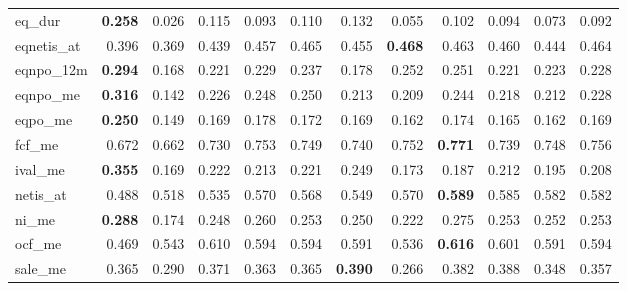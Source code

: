 \begin{landscape}
\begin{longtable}{>{\raggedright\arraybackslash}p{2.6cm}rrrrrrrrrrr}
eq\_dur & \textbf{0.258} & 0.026 & 0.115 & 0.093 & 0.110 & 0.132 & 0.055 & 0.102 & 0.094 & 0.073 & 0.092 \\
eqnetis\_at & 0.396 & 0.369 & \cellcolor{blue!10}0.439 & \cellcolor{blue!10}0.457 & \cellcolor{blue!10}0.465 & \cellcolor{blue!10}0.455 & \textbf{\cellcolor{blue!10}0.468} & \cellcolor{blue!10}0.463 & \cellcolor{blue!10}0.460 & \cellcolor{blue!10}0.444 & \cellcolor{blue!10}0.464 \\
eqnpo\_12m & \textbf{0.294} & 0.168 & 0.221 & 0.229 & 0.237 & 0.178 & 0.252 & 0.251 & 0.221 & 0.223 & 0.228 \\
eqnpo\_me & \textbf{0.316} & 0.142 & 0.226 & 0.248 & 0.250 & 0.213 & 0.209 & 0.244 & 0.218 & 0.212 & 0.228 \\
eqpo\_me & \textbf{0.250} & 0.149 & 0.169 & 0.178 & 0.172 & 0.169 & 0.162 & 0.174 & 0.165 & 0.162 & 0.169 \\
fcf\_me & 0.672 & 0.662 & \cellcolor{blue!10}0.730 & \cellcolor{blue!10}0.753 & \cellcolor{blue!10}0.749 & \cellcolor{blue!10}0.740 & \cellcolor{blue!10}0.752 & \textbf{\cellcolor{blue!10}0.771} & \cellcolor{blue!10}0.739 & \cellcolor{blue!10}0.748 & \cellcolor{blue!10}0.756 \\
ival\_me & \textbf{0.355} & 0.169 & 0.222 & 0.213 & 0.221 & 0.249 & 0.173 & 0.187 & 0.212 & 0.195 & 0.208 \\
netis\_at & 0.488 & 0.518 & \cellcolor{blue!10}0.535 & \cellcolor{blue!10}0.570 & \cellcolor{blue!10}0.568 & \cellcolor{blue!10}0.549 & \cellcolor{blue!10}0.570 & \textbf{\cellcolor{blue!10}0.589} & \cellcolor{blue!10}0.585 & \cellcolor{blue!10}0.582 & \cellcolor{blue!10}0.582 \\
ni\_me & \textbf{0.288} & 0.174 & 0.248 & 0.260 & 0.253 & 0.250 & 0.222 & 0.275 & 0.253 & 0.252 & 0.253 \\
ocf\_me & 0.469 & 0.543 & \cellcolor{blue!10}0.610 & \cellcolor{blue!10}0.594 & \cellcolor{blue!10}0.594 & \cellcolor{blue!10}0.591 & 0.536 & \textbf{\cellcolor{blue!10}0.616} & \cellcolor{blue!10}0.601 & \cellcolor{blue!10}0.591 & \cellcolor{blue!10}0.594 \\
sale\_me & 0.365 & 0.290 & \cellcolor{blue!10}0.371 & 0.363 & \cellcolor{blue!10}0.365 & \textbf{\cellcolor{blue!10}0.390} & 0.266 & \cellcolor{blue!10}0.382 & \cellcolor{blue!10}0.388 & 0.348 & 0.357 \\
\hline
\end{longtable}
\endgroup
\end{landscape}
\addtocounter{table}{-1}

